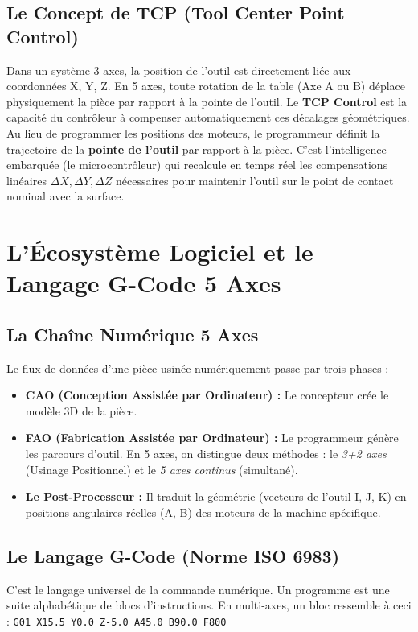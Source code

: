 \subsection{Le Concept de TCP (Tool Center Point Control)}
Dans un système 3 axes, la position de l'outil est directement liée aux coordonnées X, Y, Z. En 5 axes, toute rotation de la table (Axe A ou B) déplace physiquement la pièce par rapport à la pointe de l'outil.
Le \textbf{TCP Control} est la capacité du contrôleur à compenser automatiquement ces décalages géométriques. Au lieu de programmer les positions des moteurs, le programmeur définit la trajectoire de la \textbf{pointe de l'outil} par rapport à la pièce. C'est l'intelligence embarquée (le microcontrôleur) qui recalcule en temps réel les compensations linéaires $\Delta X, \Delta Y, \Delta Z$ nécessaires pour maintenir l'outil sur le point de contact nominal avec la surface.

\section{L'Écosystème Logiciel et le Langage G-Code 5 Axes}

\subsection{La Chaîne Numérique 5 Axes}
Le flux de données d'une pièce usinée numériquement passe par trois phases :
\begin{itemize}
    \item \textbf{CAO (Conception Assistée par Ordinateur) :} Le concepteur crée le modèle 3D de la pièce.
    \item \textbf{FAO (Fabrication Assistée par Ordinateur) :} Le programmeur génère les parcours d'outil. En 5 axes, on distingue deux méthodes : le \textit{3+2 axes} (Usinage Positionnel) et le \textit{5 axes continus} (simultané).
    \item \textbf{Le Post-Processeur :} Il traduit la géométrie (vecteurs de l'outil I, J, K) en positions angulaires réelles (A, B) des moteurs de la machine spécifique.
\end{itemize}

\subsection{Le Langage G-Code (Norme ISO 6983)}
C'est le langage universel de la commande numérique. Un programme est une suite alphabétique de blocs d'instructions. En multi-axes, un bloc ressemble à ceci :
\texttt{G01 X15.5 Y0.0 Z-5.0 A45.0 B90.0 F800}

